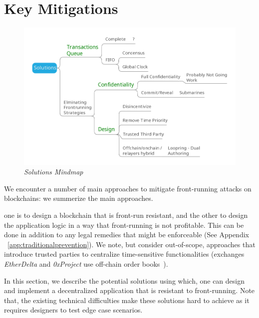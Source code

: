 \section{Key Mitigations} %


\begin{figure}[t]
\centering 
\includegraphics[width=0.7\linewidth]{figures/solutions_mindmap.png}
\caption{ \emph{Solutions Mindmap}  \label{fig:solutions_mindmap.png}}
\end{figure}


We encounter a number of main approaches to mitigate front-running attacks on blockchains: we summerize the main approaches. 



one is to design a blockchain that is front-run resistant, and the other to design the application logic in a way that front-running is not profitable. This can be done in addition to any legal remedies that might be enforceable (See Appendix ~\ref{app:traditionalprevention}). We note, but consider out-of-scope, approaches that introduce trusted parties to centralize time-sensitive functionalities (\eg exchanges \textit{EtherDelta} and \textit{0xProject} use off-chain order books~\cite{warren20170x,0xfrontrunning:online}). 



In this section, we describe the potential solutions using which, one can design and implement a decentralized application that is resistant to front-running. Note that, the existing technical difficulties make these solutions hard to achieve as it requires designers to test edge case scenarios. 


